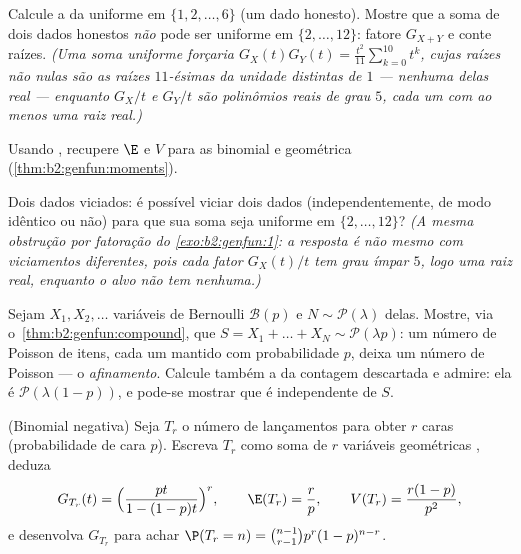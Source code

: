\begin{exercise}[$\star$]\label{exo:b2:genfun:1}
Calcule a  da  uniforme em $\{1, 2,
\dots, 6\}$ (um dado honesto). Mostre que a soma de dois dados honestos
\emph{não} pode ser uniforme em $\{2, \dots, 12\}$: fatore $G_{X+Y}$
e conte raízes. \emph{(Uma soma uniforme forçaria $G_X(t)G_Y(t) =
\frac{t^2}{11}\sum_{k=0}^{10}t^k$, cujas raízes não nulas são as
raízes $11$-ésimas da unidade distintas de $1$ --- nenhuma delas real ---
enquanto $G_X/t$ e $G_Y/t$ são polinômios reais de grau $5$, cada um
com ao menos uma raiz real.)}
\end{exercise}

\begin{exercise}[$\star$]\label{exo:b2:genfun:2}
Usando , recupere $\E$ e $V$ para as  binomial
e geométrica (\cref{thm:b2:genfun:moments}).
\end{exercise}

\begin{exercise}[$\star$]\label{exo:b2:genfun:3}
Dois dados viciados: é possível viciar dois dados (independentemente,
de modo idêntico ou não) para que sua soma seja uniforme em $\{2, \dots,
12\}$? \emph{(A mesma obstrução por fatoração do
\cref{exo:b2:genfun:1}: a resposta é não mesmo com viciamentos diferentes,
pois cada fator $G_X(t)/t$ tem grau ímpar $5$,
logo uma raiz real, enquanto o alvo não tem nenhuma.)}
\end{exercise}

\begin{exercise}[$\star\star$]\label{exo:b2:genfun:4}
Sejam $X_1, X_2, \dots$ variáveis de Bernoulli $\mathcal{B}(p)$ 
e $N \sim \mathcal{P}(\lambda)$  delas. Mostre,
via o~\cref{thm:b2:genfun:compound}, que $S = X_1 + \dots + X_N
\sim \mathcal{P}(\lambda p)$: um número de Poisson de itens, cada um mantido
com probabilidade $p$, deixa um número de Poisson --- o \emph{afinamento}.
Calcule também a  da contagem descartada e admire: ela é
$\mathcal{P}(\lambda(1-p))$, e pode-se mostrar que é independente
de $S$.
\end{exercise}

\begin{exercise}[$\star\star$]\label{exo:b2:genfun:5}
(Binomial negativa) Seja $T_r$ o número de lançamentos para obter
$r$ caras (probabilidade de cara $p$). Escreva $T_r$ como soma de $r$
variáveis geométricas , deduza
\[
G_{T_r}(t) = \Bigl(\frac{pt}{1 - (1-p)t}\Bigr)^{r},
\qquad
\E(T_r) = \frac rp,
\qquad
V(T_r) = \frac{r(1-p)}{p^2},
\]
e desenvolva $G_{T_r}$ para achar $\P(T_r = n) = \binom{n-1}{r-1}
p^r(1-p)^{n-r}$.
\end{exercise}

